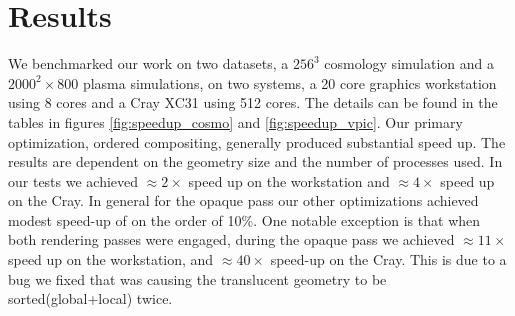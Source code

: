\documentclass[a4paper,10pt]{report}
\begin{document}
\section{Results}
We benchmarked our work on two datasets, a $256^3$ cosmology simulation and a $2000^2 \times 800$ plasma simulations, on two systems, a 20 core graphics workstation using 8 cores and a Cray XC31 using 512 cores. The details can be found in the tables in figures \ref{fig:speedup_cosmo} and \ref{fig:speedup_vpic}. Our primary optimization, ordered compositing, generally produced substantial speed up. The results are dependent on the geometry size and the number of processes used. In our tests we achieved $\approx 2 \times$ speed up on the workstation and $\approx 4 \times$ speed up on the Cray. In general for the opaque pass our other optimizations achieved modest speed-up of on the order of 10\%. One notable exception is that when both rendering passes were engaged, during the opaque pass we achieved $\approx 11 \times$ speed up on the workstation, and $\approx 40 \times$ speed-up on the Cray. This is due to a bug we fixed that was causing the translucent geometry to be sorted(global+local) twice.
\end{document}
